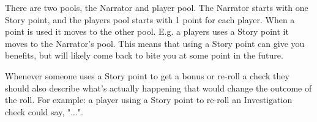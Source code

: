 



There are two pools, the Narrator and player pool. 
The Narrator starts with one Story point, and the players pool starts with 1 point for each player.
When a point is used it moves to the other pool. E.g. a players uses a Story point it moves to the Narrator's pool.
This means that using a Story point can give you benefits, but will likely come back to bite you at some point in the future.
  
Whenever someone uses a Story point to get a bonus or re-roll a check 
they should also describe what's actually happening that would change the outcome of the roll.
For example: a player using a Story point to re-roll an Investigation check could say, 
"...".

